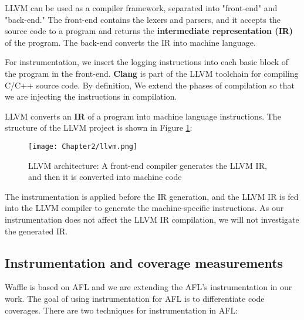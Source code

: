 \vspace{\baselineskip}

LLVM can be used as a compiler framework, separated into "front-end" and "back-end." The front-end contains the lexers and parsers, and it accepts the source code to a program and returns the \textbf{intermediate representation (IR)} of the program. The back-end converts the IR into machine language.

\vspace{\baselineskip}

For instrumentation, we insert the logging instructions into each basic block of the program in the front-end. \textbf{Clang} is part of the LLVM toolchain for compiling C/C++ source code. By definition, \cite{clang} We extend the phases of compilation so that we are injecting the instructions in compilation. 

\vspace{\baselineskip}

LLVM converts an \textbf{IR} of a program into machine language instructions. The structure of the LLVM project is shown in Figure \ref{fig:llvm}:

\begin{figure}[htpb]
    \texttt{[image: Chapter2/llvm.png]}
    \centering
    \captionsetup{justification=centering}
    \caption{LLVM architecture: A front-end compiler generates the LLVM IR, and then it is converted into machine code \cite{omni_sci}}
    \label{fig:llvm}
\end{figure}

The instrumentation is applied before the IR generation, and the LLVM IR is fed into the LLVM compiler to generate the machine-specific instructions. As our instrumentation does not affect the LLVM IR compilation, we will not investigate the generated IR.


\subsection{Instrumentation and coverage measurements}
\label{instrumentation}

Waffle is based on AFL and we are extending the AFL's instrumentation in our work. The goal of using instrumentation for AFL is to differentiate code coverages. There are two techniques for instrumentation in AFL:

